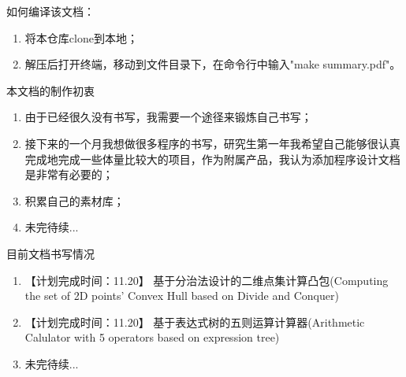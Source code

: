 \begin{center}
  \Large
  如何编译该文档：
\end{center}
\begin{enumerate}
\item 将本仓库clone到本地；
\item 解压后打开终端，移动到文件目录下，在命令行中输入"make summary.pdf"。
\end{enumerate}

\begin{center}
  \Large
  本文档的制作初衷
\end{center}

\begin{enumerate}
\item 由于已经很久没有书写，我需要一个途径来锻炼自己书写；
\item 接下来的一个月我想做很多程序的书写，研究生第一年我希望自己能够很认真完成地完成一些体量比较大的项目，作为附属产品，我认为添加程序设计文档是非常有必要的；
\item 积累自己的素材库；
\item 未完待续...
\end{enumerate}

\begin{center}
  \Large
  目前文档书写情况
\end{center}

\begin{enumerate}
\item 【计划完成时间：11.20】 基于分治法设计的二维点集计算凸包(Computing the set of 2D points' Convex Hull based on Divide and Conquer)
\item 【计划完成时间：11.20】 基于表达式树的五则运算计算器(Arithmetic Calulator with 5 operators based on expression tree)
\item 未完待续...
\end{enumerate}

